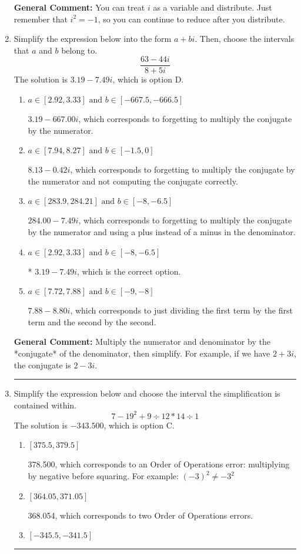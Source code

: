 \documentclass{extbook}[14pt]
\newcommand{\litem}[1]{\item #1

\rule{\textwidth}{0.4pt}}
\begin{document}
\begin{enumerate}
{\textbf{General Comment:} You can treat $i$ as a variable and distribute. Just remember that $i^2=-1$, so you can continue to reduce after you distribute.
}
\litem{
Simplify the expression below into the form $a+bi$. Then, choose the intervals that $a$ and $b$ belong to.
\[ \frac{63 - 44 i}{8 + 5 i} \]
The solution is \( 3.19  - 7.49 i \), which is option D.\begin{enumerate}[label=\Alph*.]
\item \( a \in [2.92, 3.33] \text{ and } b \in [-667.5, -666.5] \)

 $3.19  - 667.00 i$, which corresponds to forgetting to multiply the conjugate by the numerator.
\item \( a \in [7.94, 8.27] \text{ and } b \in [-1.5, 0] \)

 $8.13  - 0.42 i$, which corresponds to forgetting to multiply the conjugate by the numerator and not computing the conjugate correctly.
\item \( a \in [283.9, 284.21] \text{ and } b \in [-8, -6.5] \)

 $284.00  - 7.49 i$, which corresponds to forgetting to multiply the conjugate by the numerator and using a plus instead of a minus in the denominator.
\item \( a \in [2.92, 3.33] \text{ and } b \in [-8, -6.5] \)

* $3.19  - 7.49 i$, which is the correct option.
\item \( a \in [7.72, 7.88] \text{ and } b \in [-9, -8] \)

 $7.88  - 8.80 i$, which corresponds to just dividing the first term by the first term and the second by the second.
\end{enumerate}

\textbf{General Comment:} Multiply the numerator and denominator by the *conjugate* of the denominator, then simplify. For example, if we have $2+3i$, the conjugate is $2-3i$.
}
\litem{
Simplify the expression below and choose the interval the simplification is contained within.
\[ 7 - 19^2 + 9 \div 12 * 14 \div 1 \]
The solution is \( -343.500 \), which is option C.\begin{enumerate}[label=\Alph*.]
\item \( [375.5, 379.5] \)

 378.500, which corresponds to an Order of Operations error: multiplying by negative before squaring. For example: $(-3)^2 \neq -3^2$
\item \( [364.05, 371.05] \)

 368.054, which corresponds to two Order of Operations errors.
\item \( [-345.5, -341.5] \)


\end{enumerate}}
\end{enumerate}
\end{document}
